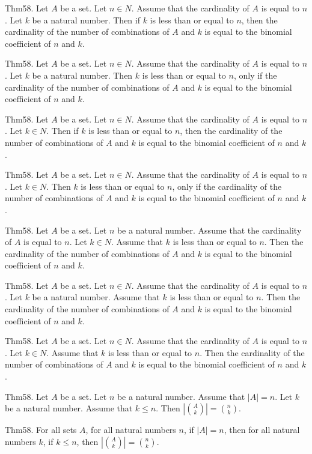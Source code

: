 \documentclass{article}
\begin{document}
Thm58. Let $A$ be a set. Let $n \in N$. Assume that the cardinality of $A$ is equal to $n$. Let $k$ be a natural number. Then if $k$ is less than or equal to $n$, then the cardinality of the number of combinations of $A$ and $k$ is equal to the binomial coefficient of $n$ and $k$.

Thm58. Let $A$ be a set. Let $n \in N$. Assume that the cardinality of $A$ is equal to $n$. Let $k$ be a natural number. Then $k$ is less than or equal to $n$, only if the cardinality of the number of combinations of $A$ and $k$ is equal to the binomial coefficient of $n$ and $k$.

Thm58. Let $A$ be a set. Let $n \in N$. Assume that the cardinality of $A$ is equal to $n$. Let $k \in N$. Then if $k$ is less than or equal to $n$, then the cardinality of the number of combinations of $A$ and $k$ is equal to the binomial coefficient of $n$ and $k$.

Thm58. Let $A$ be a set. Let $n \in N$. Assume that the cardinality of $A$ is equal to $n$. Let $k \in N$. Then $k$ is less than or equal to $n$, only if the cardinality of the number of combinations of $A$ and $k$ is equal to the binomial coefficient of $n$ and $k$.

Thm58. Let $A$ be a set. Let $n$ be a natural number. Assume that the cardinality of $A$ is equal to $n$. Let $k \in N$. Assume that $k$ is less than or equal to $n$. Then the cardinality of the number of combinations of $A$ and $k$ is equal to the binomial coefficient of $n$ and $k$.

Thm58. Let $A$ be a set. Let $n \in N$. Assume that the cardinality of $A$ is equal to $n$. Let $k$ be a natural number. Assume that $k$ is less than or equal to $n$. Then the cardinality of the number of combinations of $A$ and $k$ is equal to the binomial coefficient of $n$ and $k$.

Thm58. Let $A$ be a set. Let $n \in N$. Assume that the cardinality of $A$ is equal to $n$. Let $k \in N$. Assume that $k$ is less than or equal to $n$. Then the cardinality of the number of combinations of $A$ and $k$ is equal to the binomial coefficient of $n$ and $k$.

Thm58. Let $A$ be a set. Let $n$ be a natural number. Assume that $| A | = n$. Let $k$ be a natural number. Assume that $k \leq n$. Then $| \binom{ A }{ k}| = \binom{ n }{ k}$.

Thm58. For all sets $A$, for all natural numbers $n$, if $| A | = n$, then for all natural numbers $k$, if $k \leq n$, then $| \binom{ A }{ k}| = \binom{ n }{ k}$.
\end{document}
